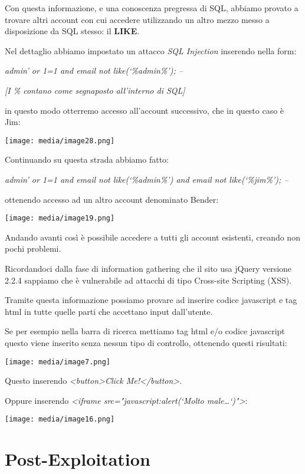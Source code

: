 Con questa informazione, e una conoscenza pregressa di SQL, abbiamo
provato a trovare altri account con cui accedere utilizzando un altro
mezzo messo a disposizione da SQL stesso: il \textbf{LIKE}.

Nel dettaglio abbiamo impostato un attacco \emph{SQL Injection}
inserendo nella form:

\emph{admin' or 1=1 and email not like(`\%admin\%'); --}

\emph{{[}I \% contano come segnaposto all'interno di SQL{]}}

in questo modo otterremo accesso all'account successivo, che in questo
caso è Jim:

\texttt{[image: media/image28.png]}

Continuando su questa strada abbiamo fatto:

\emph{admin' or 1=1 and email not like(`\%admin\%') and email not
like(`\%jim\%'); --}

ottenendo accesso ad un altro account denominato Bender:

\texttt{[image: media/image19.png]}

Andando avanti così è possibile accedere a tutti gli account esistenti,
creando non pochi problemi.

Ricordandoci dalla fase di information gathering che il sito usa jQuery
versione 2.2.4 sappiamo che è vulnerabile ad attacchi di tipo Cross-site
Scripting (XSS).

Tramite questa informazione possiamo provare ad inserire codice
javascript e tag html in tutte quelle parti che accettano input
dall'utente.

Se per esempio nella barra di ricerca mettiamo tag html e/o codice
javascript questo viene inserito senza nessun tipo di controllo,
ottenendo questi risultati:

\texttt{[image: media/image7.png]}

Questo inserendo \emph{\textless button\textgreater Click
Me!\textless/button\textgreater{}}.

Oppure inserendo \emph{\textless iframe src="javascript:alert(`Molto
male\ldots`)"\textgreater{}}:

\texttt{[image: media/image16.png]}

\section{Post-Exploitation}\label{post-exploitation}

